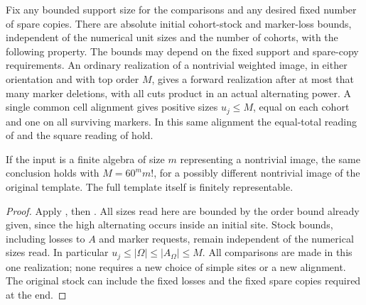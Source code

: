 \begin{theorem}\label{t:weighted-realization}
Fix any bounded support size for the comparisons and any desired fixed
number of spare copies.  There are absolute initial cohort-stock and
marker-loss bounds, independent of the numerical unit sizes and the number
of cohorts, with the following property.  The bounds may depend on the
fixed support and spare-copy requirements.  An ordinary realization of a
nontrivial weighted image, in either orientation and with top order \(M\),
gives a forward realization after at most that many marker deletions, with
all cuts product in an actual alternating power.  A single common cell
alignment gives positive sizes \(u_j\le M\), equal on each cohort and one
on all surviving markers.  In this same alignment the equal-total reading
of  and the square reading of
 hold.

If the input is a finite algebra of size \(m\) representing a nontrivial
image, the same conclusion holds with \(M=60^m m!\), for a possibly
different nontrivial image of the original template.  The full template
itself is finitely representable.
\end{theorem}
\begin{proof}
Apply ,
then .
All sizes read here are bounded by the order bound already given, since the high alternating
occurs inside an initial site. Stock bounds, including losses to \(A\) and marker requests, remain
independent of the numerical sizes read.
In particular \(u_j\le |\Omega|\le |A_\Omega|\le M\).  All comparisons are
made in this one realization; none requires a new choice of simple sites
or a new alignment.  The original stock can include the fixed losses and
the fixed spare copies required at the end.
\end{proof}


\FloatBarrier
